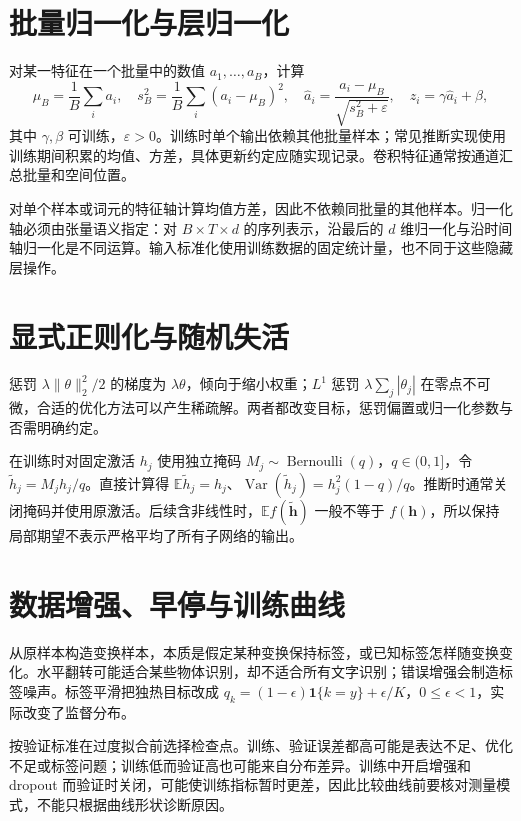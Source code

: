 \documentclass[UTF8,12pt,a4paper,fontset=fandol]{ctexbook}
\begin{document}
\section{批量归一化与层归一化}
对某一特征在一个批量中的数值 $a_1,\ldots,a_B$，计算
\[
\mu_B=\frac1B\sum_i a_i,\quad s_B^2=\frac1B\sum_i(a_i-\mu_B)^2,\quad
\widehat a_i=\frac{a_i-\mu_B}{\sqrt{s_B^2+\varepsilon}},\quad z_i=\gamma\widehat a_i+\beta,
\]
其中 $\gamma,\beta$ 可训练，$\varepsilon>0$。训练时单个输出依赖其他批量样本；常见推断实现使用训练期间积累的均值、方差，具体更新约定应随实现记录。卷积特征通常按通道汇总批量和空间位置。

对单个样本或词元的特征轴计算均值方差，因此不依赖同批量的其他样本。归一化轴必须由张量语义指定：对 $B\times T\times d$ 的序列表示，沿最后的 $d$ 维归一化与沿时间轴归一化是不同运算。输入标准化使用训练数据的固定统计量，也不同于这些隐藏层操作。

\section{显式正则化与随机失活}
惩罚 $\lambda\|\theta\|_2^2/2$ 的梯度为 $\lambda\theta$，倾向于缩小权重；$L^1$ 惩罚 $\lambda\sum_j|\theta_j|$ 在零点不可微，合适的优化方法可以产生稀疏解。两者都改变目标，惩罚偏置或归一化参数与否需明确约定。

在训练时对固定激活 $h_j$ 使用独立掩码 $M_j\sim\operatorname{Bernoulli}(q)$，$q\in(0,1]$，令 $\widetilde h_j=M_jh_j/q$。直接计算得 $\mathbb E\widetilde h_j=h_j$、$\operatorname{Var}(\widetilde h_j)=h_j^2(1-q)/q$。推断时通常关闭掩码并使用原激活。后续含非线性时，$\mathbb E f(\widetilde{\mathbf h})$ 一般不等于 $f(\mathbf h)$，所以保持局部期望不表示严格平均了所有子网络的输出。

\section{数据增强、早停与训练曲线}
从原样本构造变换样本，本质是假定某种变换保持标签，或已知标签怎样随变换变化。水平翻转可能适合某些物体识别，却不适合所有文字识别；错误增强会制造标签噪声。标签平滑把独热目标改成 $q_k=(1-\epsilon)\mathbf1\{k=y\}+\epsilon/K$，$0\leq\epsilon<1$，实际改变了监督分布。

按验证标准在过度拟合前选择检查点。训练、验证误差都高可能是表达不足、优化不足或标签问题；训练低而验证高也可能来自分布差异。训练中开启增强和 dropout 而验证时关闭，可能使训练指标暂时更差，因此比较曲线前要核对测量模式，不能只根据曲线形状诊断原因。
\end{document}
